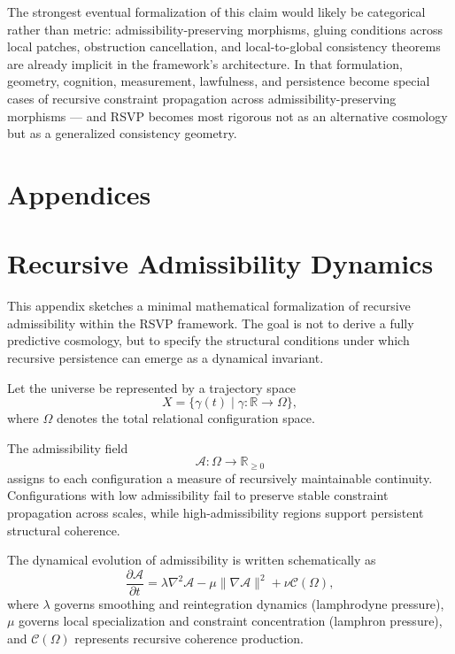\documentclass[12pt, a4paper]{article}
\newcommand{\Afield}{\mathcal{A}}
\newcommand{\Xtraj}{X}
\begin{document}
The strongest eventual formalization of this claim would likely be
categorical rather than metric: admissibility-preserving morphisms,
gluing conditions across local patches, obstruction cancellation, and
local-to-global consistency theorems are already implicit in the framework's
architecture. In that formulation, geometry, cognition, measurement,
lawfulness, and persistence become special cases of recursive constraint
propagation across admissibility-preserving morphisms — and RSVP becomes
most rigorous not as an alternative cosmology but as a generalized
consistency geometry.

\newpage
\appendix
\section*{Appendices}

\section{Recursive Admissibility Dynamics}

This appendix sketches a minimal mathematical formalization of recursive
admissibility within the RSVP framework. The goal is not to derive a fully
predictive cosmology, but to specify the structural conditions under which
recursive persistence can emerge as a dynamical invariant.

Let the universe be represented by a trajectory space
\[
\Xtraj = \{ \gamma(t) \mid \gamma : \mathbb{R} \to \Omega \},
\]
where \(\Omega\) denotes the total relational configuration space.

The admissibility field
\[
\Afield : \Omega \to \mathbb{R}_{\geq 0}
\]
assigns to each configuration a measure of recursively maintainable
continuity. Configurations with low admissibility fail to preserve stable
constraint propagation across scales, while high-admissibility regions
support persistent structural coherence.

The dynamical evolution of admissibility is written schematically as
\[
\frac{\partial \Afield}{\partial t}
=
\lambda \nabla^2 \Afield
-
\mu \|\nabla \Afield\|^2
+
\nu \mathcal{C}(\Omega),
\]
where \(\lambda\) governs smoothing and reintegration dynamics
(lamphrodyne pressure), \(\mu\) governs local specialization and constraint
concentration (lamphron pressure), and \(\mathcal{C}(\Omega)\) represents
recursive coherence production.
\end{document}
